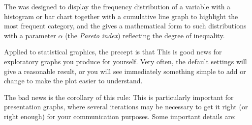 \documentclass[10pt,krantz2]{krantz}\usepackage[]{graphicx}\usepackage[]{color}
\begin{document}
The  was designed to display the frequency distribution of
a variable with a histogram or bar chart together with a cumulative line graph
to highlight the most frequent category, and the 
gives a mathematical form to such distributions with a parameter $\alpha$
(the \emph{Pareto index})
reflecting the degree of inequality.

Applied to statistical graphics, the precept is that
This is good news for exploratory
graphs you produce for yourself.  Very often, the default settings will give a reasonable
result, or you will see immediately something simple to add or change to make the plot
easier to understand.

The bad news is the corollary of this rule:
This is particularly important for presentation graphs, where several iterations
may be necessary to get it right (or right enough) for your communication purposes.
Some important details are:
\end{document}
